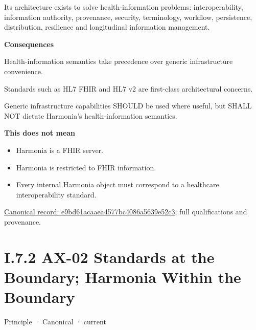 Its architecture exists to solve health-information problems:
interoperability, information authority, provenance, security,
terminology, workflow, persistence, distribution, resilience and
longitudinal information management.



\par\medskip\textbf{Consequences}\par


Health-information semantics take precedence over generic infrastructure
convenience.



Standards such as HL7 FHIR and HL7 v2 are first-class architectural
concerns.



Generic infrastructure capabilities SHOULD be used where useful, but
SHALL NOT dictate Harmonia's health-information semantics.



\textbf{This does not mean}



\begin{itemize}


\item Harmonia is a FHIR server.

\item Harmonia is restricted to FHIR information.

\item Every internal Harmonia object must correspond to a healthcare interoperability standard.

\end{itemize}

{\footnotesize \href{../../../../../../../continuum/motivation/principle/e9bd61acaaea4577bc4086a5639e52c3.md}{Canonical record: e9bd61acaaea4577bc4086a5639e52c3}; full qualifications and provenance.}\par
\section*{I.7.2 AX-02 Standards at the Boundary; Harmonia Within the Boundary}
\label{navigation:I.7.2}

\label{element:eee8c3783d964d18a7f9dcea85fcd4cf}
{\small Principle · Canonical · current}\par


